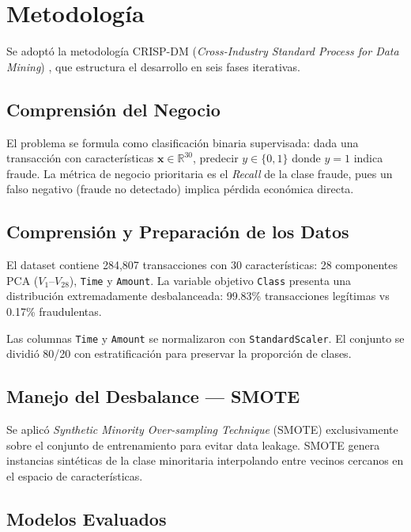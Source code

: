 \section{Metodología}

Se adoptó la metodología CRISP-DM (\textit{Cross-Industry Standard Process
for Data Mining}) \cite{wirth2000crisp}, que estructura el desarrollo en
seis fases iterativas.

\subsection{Comprensión del Negocio}
El problema se formula como clasificación binaria supervisada: dada una
transacción con características $\mathbf{x} \in \mathbb{R}^{30}$, predecir
$y \in \{0, 1\}$ donde $y=1$ indica fraude. La métrica de negocio
prioritaria es el \textit{Recall} de la clase fraude, pues un falso
negativo (fraude no detectado) implica pérdida económica directa.

\subsection{Comprensión y Preparación de los Datos}
El dataset contiene 284,807 transacciones con 30 características:
28 componentes PCA ($V_1$–$V_{28}$), \texttt{Time} y \texttt{Amount}.
La variable objetivo \texttt{Class} presenta una distribución extremadamente
desbalanceada: 99.83\% transacciones legítimas vs 0.17\% fraudulentas.

Las columnas \texttt{Time} y \texttt{Amount} se normalizaron con
\texttt{StandardScaler}. El conjunto se dividió 80/20 con estratificación
para preservar la proporción de clases.

\subsection{Manejo del Desbalance — SMOTE}
Se aplicó \textit{Synthetic Minority Over-sampling Technique} (SMOTE)
\cite{chawla2002smote} exclusivamente sobre el conjunto de entrenamiento
para evitar data leakage. SMOTE genera instancias sintéticas de la clase
minoritaria interpolando entre vecinos cercanos en el espacio de
características.

\subsection{Modelos Evaluados}

